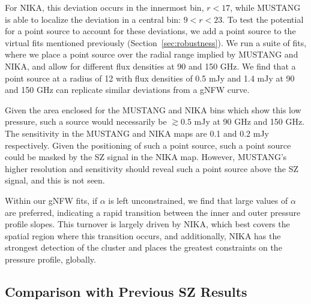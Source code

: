 \documentclass[iop,numberedappendix,apj]{emulateapj}
\begin{document}
For NIKA, this deviation occurs in the innermost bin, $r < 17$\asec, while MUSTANG is able to localize the
deviation in a central bin: $9 < r < 23$\asec. To test the potential for a point source to account for these
deviations, we add a point source to the virtual fits mentioned previously (Section~\ref{sec:robustness}).
We run a suite of fits, where we place a point source over the radial range implied by MUSTANG and NIKA,
and allow for different flux densities at 90 and 150 GHz. We find that a point source at a radius of 12\asecs
with flux densities of 0.5 mJy and 1.4 mJy at 90 and 150 GHz can replicate similar deviations from a gNFW
curve.

Given the area enclosed for the MUSTANG and NIKA bins which
show this low pressure, such a source would necessarily be $\gtrsim 0.5$ mJy at 90 GHz and 150 GHz.
The sensitivity in the MUSTANG and NIKA maps are 0.1 and 0.2 mJy respectively. Given the positioning of such a
point source, such a point source could be masked by the SZ signal in the NIKA map. However, MUSTANG's
higher resolution and sensitivity should reveal such a point source above the SZ signal, and this is not seen.

Within our gNFW fits, if $\alpha$ is left unconstrained, we find that large values of $\alpha$ are preferred,
indicating a rapid transition between the inner and outer pressure profile slopes. This turnover is largely
driven by NIKA, which best covers the spatial region where this transition occurs, and additionally, NIKA
has the strongest detection of the cluster and places the greatest constraints on the pressure profile, globally.

\subsection{Comparison with Previous SZ Results}
\label{sec:prev_res}
\end{document}
